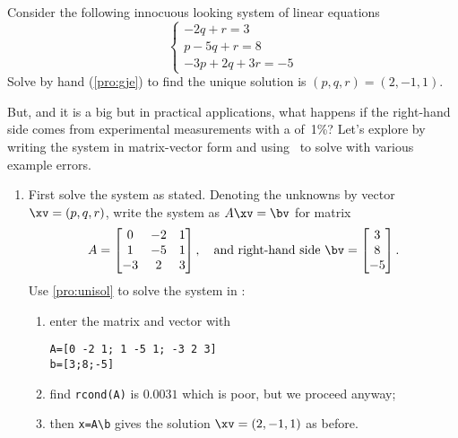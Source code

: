 \begin{example} \label{eg:ilsle}
Consider the following innocuous looking system of linear equations
\begin{equation*}
\begin{cases}
-2q+r=3
\\p-5q+r=8
\\-3p+2q+3r=-5
\end{cases}
\end{equation*}
Solve by hand (\autoref{pro:gje}) to find the unique solution is \((p,q,r)=(2,-1,1)\).

But, and it is a big but in practical applications, what happens if the right-hand side comes from experimental measurements with a  of~1\%? 
Let's explore by writing the system in matrix-vector form and using \script\ to solve with various example errors.
\begin{enumerate}
\item First solve the system as stated.  
Denoting the unknowns by vector \(\xv=(p,q,r)\), write the system as \(A\xv=\bv\) for matrix
\begin{equation*}
A=\begin{bmatrix} 0&-2&1
\\1&-5&1
\\-3&2&3 \end{bmatrix},
\quad\text{and right-hand side }
\bv=\begin{bmatrix} 3\\8\\-5 \end{bmatrix}.
\end{equation*}
Use \autoref{pro:unisol} to solve the system in \script:
\begin{enumerate}
\item enter the matrix and vector with
\setbox\ajrqrbox\hbox{}%
\marginpar{\usebox{\ajrqrbox\\[2ex]}}%
\begin{verbatim}
A=[0 -2 1; 1 -5 1; -3 2 3]
b=[3;8;-5]
\end{verbatim}
\item find \verb|rcond(A)| is \(0.0031\) which is poor, but we proceed anyway;
\item then \verb|x=A\b| gives the solution \(\xv=(2,-1,1)\) as before.
\end{enumerate}


\end{enumerate}
\end{example}
